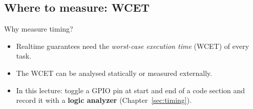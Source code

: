\subsection{Where to measure: WCET}
\begin{frame}{Why measure timing?}
  \begin{itemize}
    \item Realtime guarantees need the \emph{worst-case execution time} (WCET) of every task.
    \item The WCET can be analysed statically or measured externally.
    \item In this lecture: toggle a GPIO pin at start and end of a code section and record it with a \textbf{logic analyzer} (Chapter~\ref{sec:timing}).
  \end{itemize}
\end{frame}
